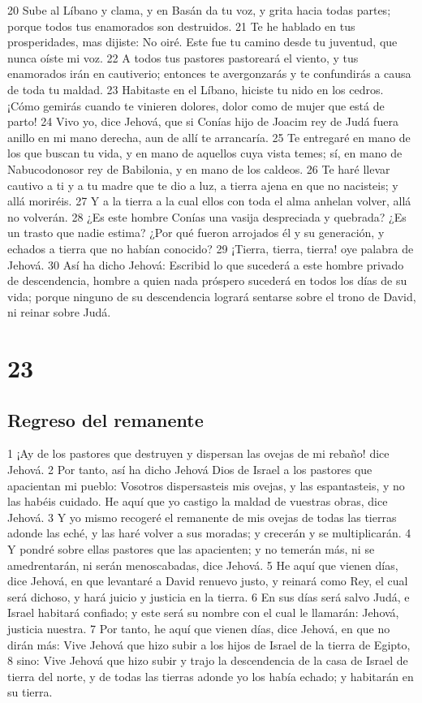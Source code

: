 20 Sube al Líbano y clama, y en Basán da tu voz, y grita hacia todas partes; porque todos tus enamorados son destruidos.
21 Te he hablado en tus prosperidades, mas dijiste: No oiré. Este fue tu camino desde tu juventud, que nunca oíste mi voz.
22 A todos tus pastores pastoreará el viento, y tus enamorados irán en cautiverio; entonces te avergonzarás y te confundirás a causa de toda tu maldad.
23 Habitaste en el Líbano, hiciste tu nido en los cedros. ¡Cómo gemirás cuando te vinieren dolores, dolor como de mujer que está de parto!
24 Vivo yo, dice Jehová, que si Conías hijo de Joacim rey de Judá fuera anillo en mi mano derecha, aun de allí te arrancaría.
25 Te entregaré en mano de los que buscan tu vida, y en mano de aquellos cuya vista temes; sí, en mano de Nabucodonosor rey de Babilonia, y en mano de los caldeos.
26 Te haré llevar cautivo a ti y a tu madre que te dio a luz, a tierra ajena en que no nacisteis; y allá moriréis.
27 Y a la tierra a la cual ellos con toda el alma anhelan volver, allá no volverán.
28 ¿Es este hombre Conías una vasija despreciada y quebrada? ¿Es un trasto que nadie estima? ¿Por qué fueron arrojados él y su generación, y echados a tierra que no habían conocido?
29 ¡Tierra, tierra, tierra! oye palabra de Jehová.
30 Así ha dicho Jehová: Escribid lo que sucederá a este hombre privado de descendencia, hombre a quien nada próspero sucederá en todos los días de su vida; porque ninguno de su descendencia logrará sentarse sobre el trono de David, ni reinar sobre Judá.

\chapter{23}

\section*{Regreso del remanente}

1 ¡Ay de los pastores que destruyen y dispersan las ovejas de mi rebaño! dice Jehová.
2 Por tanto, así ha dicho Jehová Dios de Israel a los pastores que apacientan mi pueblo: Vosotros dispersasteis mis ovejas, y las espantasteis, y no las habéis cuidado. He aquí que yo castigo la maldad de vuestras obras, dice Jehová.
3 Y yo mismo recogeré el remanente de mis ovejas de todas las tierras adonde las eché, y las haré volver a sus moradas; y crecerán y se multiplicarán.
4 Y pondré sobre ellas pastores que las apacienten; y no temerán más, ni se amedrentarán, ni serán menoscabadas, dice Jehová.
5 He aquí que vienen días, dice Jehová, en que levantaré a David renuevo justo, y reinará como Rey, el cual será dichoso, y hará juicio y justicia en la tierra. 
6 En sus días será salvo Judá, e Israel habitará confiado; y este será su nombre con el cual le llamarán: Jehová, justicia nuestra. 
7 Por tanto, he aquí que vienen días, dice Jehová, en que no dirán más: Vive Jehová que hizo subir a los hijos de Israel de la tierra de Egipto,
8 sino: Vive Jehová que hizo subir y trajo la descendencia de la casa de Israel de tierra del norte, y de todas las tierras adonde yo los había echado; y habitarán en su tierra.

